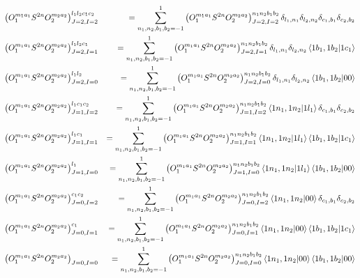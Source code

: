 \documentclass{article}
\newcommand{\bea}{\begin{eqnarray}}
\newcommand{\eea}{\end{eqnarray}}
\begin{document}
\bea 
\left(O^{m_1 a_1}_1 S^{2n} O^{m_2 a_2}_2\right)^{l_1 l_2 c_1 c_2}_{J=2,I=2} &&= \sum_{n_1,n_2,b_1,b_2=-1}^{1}\left(O^{m_1 a_1}_1 S^{2n} O^{m_2 a_2}_2\right)^{n_1 n_2 b_1 b_2}_{J=2,I=2}\delta_{l_1,n_1}\delta_{l_2,n_2}\delta_{c_1,b_1}\delta_{c_2,b_2}\nonumber \\
\left(O^{m_1 a_1}_1 S^{2n} O^{m_2 a_2}_2\right)^{l_1 l_2 c_1}_{J=2,I=1} &&= \sum_{n_1,n_2,b_1,b_2=-1}^{1}\left(O^{m_1 a_1}_1 S^{2n} O^{m_2 a_2}_2\right)^{n_1 n_2 b_1 b_2}_{J=2,I=1}\delta_{l_1,n_1}\delta_{l_2,n_2}\bra{1b_1,1b_2}\ket{1c_1} \nonumber \\
\left(O^{m_1 a_1}_1 S^{2n} O^{m_2 a_2}_2\right)^{l_1 l_2}_{J=2,I=0} &&= \sum_{n_1,n_2,b_1,b_2=-1}^{1}\left(O^{m_1 a_1}_1 S^{2n} O^{m_2 a_2}_2\right)^{n_1 n_2 b_1 b_2}_{J=2,I=0}\delta_{l_1,n_1}\delta_{l_2,n_2}\bra{1b_1,1b_2}\ket{00} \nonumber \\
\left(O^{m_1 a_1}_1 S^{2n} O^{m_2 a_2}_2\right)^{l_1 c_1 c_2}_{J=1,I=2} &&= \sum_{n_1,n_2,b_1,b_2=-1}^{1}\left(O^{m_1 a_1}_1 S^{2n} O^{m_2 a_2}_2\right)^{n_1 n_2 b_1 b_2}_{J=1,I=2}\bra{1n_1,1n_2}\ket{1l_1} \delta_{c_1,b_1}\delta_{c_2,b_2} \nonumber \\
\left(O^{m_1 a_1}_1 S^{2n} O^{m_2 a_2}_2\right)^{l_1 c_1}_{J=1,I=1} &&= \sum_{n_1,n_2,b_1,b_2=-1}^{1}\left(O^{m_1 a_1}_1 S^{2n} O^{m_2 a_2}_2\right)^{n_1 n_2 b_1 b_2}_{J=1,I=1}\bra{1n_1,1n_2}\ket{1l_1} \bra{1b_1,1b_2}\ket{1c_1} \nonumber \\
\left(O^{m_1 a_1}_1 S^{2n} O^{m_2 a_2}_2\right)^{l_1}_{J=1,I=0} &&= \sum_{n_1,n_2,b_1,b_2=-1}^{1}\left(O^{m_1 a_1}_1 S^{2n} O^{m_2 a_2}_2\right)^{n_1 n_2 b_1 b_2}_{J=1,I=0}\bra{1n_1,1n_2}\ket{1l_1} \bra{1b_1,1b_2}\ket{00} \nonumber \\
\left(O^{m_1 a_1}_1 S^{2n} O^{m_2 a_2}_2\right)^{ c_1 c_2}_{J=0,I=2} &&= \sum_{n_1,n_2,b_1,b_2=-1}^{1}\left(O^{m_1 a_1}_1 S^{2n} O^{m_2 a_2}_2\right)^{n_1 n_2 b_1 b_2}_{J=0,I=2}\bra{1n_1,1n_2}\ket{00} \delta_{c_1,b_1}\delta_{c_2,b_2} \nonumber \\
\left(O^{m_1 a_1}_1 S^{2n} O^{m_2 a_2}_2\right)^{c_1 }_{J=0,I=1} &&= \sum_{n_1,n_2,b_1,b_2=-1}^{1}\left(O^{m_1 a_1}_1 S^{2n} O^{m_2 a_2}_2\right)^{n_1 n_2 b_1 b_2}_{J=0,I=1}\bra{1n_1,1n_2}\ket{00} \bra{1b_1,1b_2}\ket{1c_1}  \nonumber \\
\left(O^{m_1 a_1}_1 S^{2n} O^{m_2 a_2}_2\right)^{ }_{J=0,I=0} &&= \sum_{n_1,n_2,b_1,b_2=-1}^{1}\left(O^{m_1 a_1}_1 S^{2n} O^{m_2 a_2}_2\right)^{n_1 n_2 b_1 b_2}_{J=0,I=0}\bra{1n_1,1n_2}\ket{00} \bra{1b_1,1b_2}\ket{00}  \nonumber 
\eea
\end{document}
